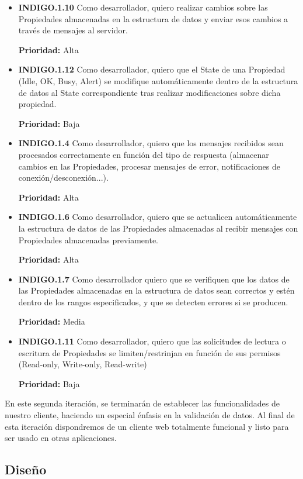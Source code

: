 \begin{itemize}[leftmargin=10mm]
	\item \textbf{INDIGO.1.10 }Como desarrollador, quiero realizar cambios sobre las Propiedades almacenadas en la estructura de datos y enviar esos cambios a través de mensajes al servidor.
	
	\textbf{Prioridad:} Alta
	\item \textbf{INDIGO.1.12 }Como desarrollador, quiero que el State de una Propiedad (Idle, OK, Busy, Alert) se modifique automáticamente dentro de la estructura de datos al State correspondiente tras realizar modificaciones sobre dicha propiedad.
	
	\textbf{Prioridad:} Baja
	\item \textbf{INDIGO.1.4 }Como desarrollador, quiero que los mensajes recibidos sean procesados correctamente en función del tipo de respuesta (almacenar cambios en las Propiedades, procesar mensajes de error, notificaciones de conexión/desconexión...).
	
	\textbf{Prioridad:} Alta
	\item \textbf{INDIGO.1.6 }Como desarrollador, quiero que se actualicen automáticamente la estructura de datos de las Propiedades almacenadas al recibir mensajes con Propiedades almacenadas previamente.
	
	\textbf{Prioridad:} Alta
	\item \textbf{INDIGO.1.7 }Como desarrollador quiero que se verifiquen que los datos de las Propiedades almacenadas en la estructura de datos sean correctos y estén dentro de los rangos especificados, y que se detecten errores si se producen.
	
	\textbf{Prioridad:} Media
	\item \textbf{INDIGO.1.11 }Como desarrollador, quiero que las solicitudes de lectura o escritura de Propiedades se limiten/restrinjan en función de sus permisos (Read-only, Write-only, Read-write)
	
	\textbf{Prioridad:} Baja
\end{itemize}

En este segunda iteración, se terminarán de establecer las funcionalidades de nuestro cliente, haciendo un especial énfasis en la validación de datos. Al final de esta iteración dispondremos de un cliente web totalmente funcional y listo para ser usado en otras aplicaciones.


\subsection{Diseño}

